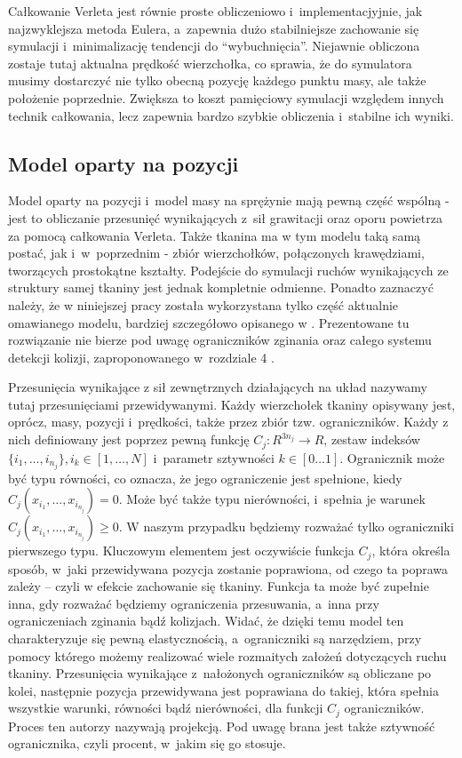 			Całkowanie Verleta jest równie proste obliczeniowo i~implementacjyjnie, jak najzwyklejsza metoda Eulera, a~zapewnia dużo stabilniejsze zachowanie się symulacji i~minimalizację tendencji do ``wybuchnięcia''. Niejawnie obliczona zostaje tutaj aktualna prędkość wierzchołka, co sprawia, że do symulatora musimy dostarczyć nie tylko obecną pozycję każdego punktu masy, ale także położenie poprzednie. Zwiększa to koszt pamięciowy symulacji względem innych technik całkowania, lecz zapewnia bardzo szybkie obliczenia i~stabilne ich wyniki.
		
		\subsection{Model oparty na pozycji}
		\label{t:teoria:analiza:poz}
		
			Model oparty na pozycji i~model masy na sprężynie mają pewną część wspólną - jest to obliczanie przesunięć wynikających z~sił grawitacji oraz oporu powietrza za pomocą całkowania Verleta. Także tkanina ma w tym modelu taką samą postać, jak i~w~poprzednim - zbiór wierzchołków, połączonych krawędziami, tworzących prostokątne kształty. Podejście do symulacji ruchów wynikających ze struktury samej tkaniny jest jednak kompletnie odmienne. Ponadto zaznaczyć należy, że w niniejszej pracy została wykorzystana tylko część aktualnie omawianego modelu, bardziej szczegółowo opisanego w \cite{posbased}. Prezentowane tu rozwiązanie nie bierze pod uwagę ograniczników zginania oraz całego systemu detekcji kolizji, zaproponowanego w~rozdziale 4 \cite{posbased}.
			
			Przesunięcia wynikające z sił zewnętrznych działających na układ nazywamy tutaj przesunięciami przewidywanymi. Każdy wierzchołek tkaniny opisywany jest, oprócz, masy, pozycji i~prędkości, także przez zbiór tzw. ograniczników. Każdy z nich definiowany jest poprzez pewną funkcję \(C_{j} : R^{3n_{j}} \rightarrow R\), zestaw indeksów \(\{ i_{1}, \dots, i_{n_{j}}  \}, i_{k} \in [1, \dots, N] \) i~parametr sztywności \(k \in [0\dots1] \). Ogranicznik może być typu równości, co oznacza, że jego ograniczenie jest spełnione, kiedy \( C_{j}(x_{i_{1}}, \dots, x_{i_{n_{j}}} ) = 0 \). Może być także typu nierówności, i~spełnia je warunek \( C_{j}(x_{i_{1}}, \dots, x_{i_{n_{j}}} ) \geq 0 \). W naszym przypadku będziemy rozważać tylko ograniczniki pierwszego typu. Kluczowym elementem jest oczywiście funkcja \(C_{j}\), która określa sposób, w~jaki przewidywana pozycja zostanie poprawiona, od czego ta poprawa zależy -- czyli w efekcie zachowanie się tkaniny. Funkcja ta może być zupełnie inna, gdy rozważać będziemy ograniczenia przesuwania, a~inna przy ograniczeniach zginania bądź kolizjach. Widać, że dzięki temu model ten charakteryzuje się pewną elastycznością, a~ograniczniki są narzędziem, przy pomocy którego możemy realizować wiele rozmaitych założeń dotyczących ruchu tkaniny. Przesunięcia wynikające z~nałożonych ograniczników są obliczane po kolei, następnie pozycja przewidywana jest poprawiana do takiej, która spełnia wszystkie warunki, równości bądź nierówności, dla funkcji \(C_{j}\) ograniczników. Proces ten autorzy \cite{posbased} nazywają projekcją. Pod uwagę brana jest także sztywność ogranicznika, czyli procent, w~jakim się go stosuje.
			
